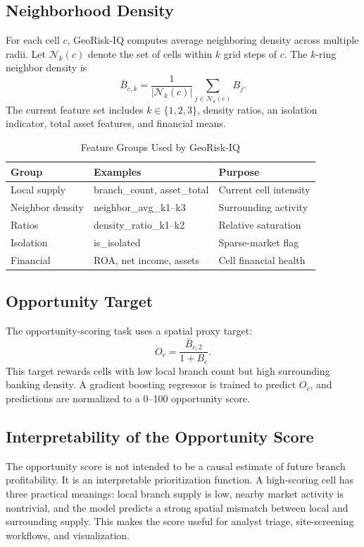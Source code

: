 \documentclass[conference]{IEEEtran}
\begin{document}
\subsection{Neighborhood Density}
For each cell $c$, GeoRisk-IQ computes average neighboring density across
multiple radii. Let $\mathcal{N}_k(c)$ denote the set of cells within
$k$ grid steps of $c$. The $k$-ring neighbor density is
\begin{equation}
    \bar{B}_{c,k} =
    \frac{1}{|\mathcal{N}_k(c)|}\sum_{j \in \mathcal{N}_k(c)} B_j.
\end{equation}
The current feature set includes $k \in \{1,2,3\}$, density ratios,
an isolation indicator, total asset features, and financial means.

\begin{table}[t]
\caption{Feature Groups Used by GeoRisk-IQ}
\label{tab:feature_groups}
\centering
\begin{tabular}{lll}
\toprule
Group & Examples & Purpose \\
\midrule
Local supply & branch\_count, asset\_total & Current cell intensity \\
Neighbor density & neighbor\_avg\_k1--k3 & Surrounding activity \\
Ratios & density\_ratio\_k1--k2 & Relative saturation \\
Isolation & is\_isolated & Sparse-market flag \\
Financial & ROA, net income, assets & Cell financial health \\
\bottomrule
\end{tabular}
\end{table}

\subsection{Opportunity Target}
The opportunity-scoring task uses a spatial proxy target:
\begin{equation}
    O_c = \frac{\bar{B}_{c,2}}{1 + B_c}.
\end{equation}
This target rewards cells with low local branch count but high surrounding
banking density. A gradient boosting regressor is trained to predict
$O_c$, and predictions are normalized to a 0--100 opportunity score.

\subsection{Interpretability of the Opportunity Score}
The opportunity score is not intended to be a causal estimate of future
branch profitability. It is an interpretable prioritization function. A
high-scoring cell has three practical meanings: local branch supply is low,
nearby market activity is nontrivial, and the model predicts a strong
spatial mismatch between local and surrounding supply. This makes the score
useful for analyst triage, site-screening workflows, and visualization.
\end{document}
